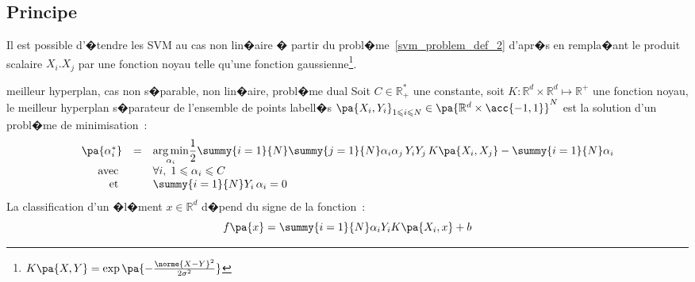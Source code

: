 \subsection{Principe}

Il est possible d'�tendre les SVM au cas non lin�aire � partir du probl�me~\ref{svm_problem_def_2} d'apr�s  en rempla�ant le produit scalaire $X_i . X_j$ par une fonction noyau telle qu'une fonction gaussienne\footnote{$K\pa{X,Y} = \exp\pa{ - \frac{ \norme{ X - Y }^2 }{2 \sigma^2}}$}.


            \begin{xproblem}{meilleur hyperplan, cas non s�parable, non lin�aire, probl�me dual}\label{svm_problem_def_3}
            Soit $C \in \mathbb{R}^*_+$ une constante, soit $K : \mathbb{R}^d \times \mathbb{R}^d \longmapsto \mathbb{R}^+$ une fonction noyau,
            le meilleur hyperplan s�parateur de l'ensemble de points labell�s
            $\pa{X_i,Y_i}_{1 \leqslant i \leqslant N} \in \pa{ \mathbb{R}^d \times \acc{-1,1} }^N$ est la solution
            d'un probl�me de minimisation~: 
                    $$
                    \begin{array}{rcl}    \pa{\alpha_i^*} &=& \underset{\alpha_i}{\arg \min} \dfrac{1}{2}  
                                                                                    \summy{i=1}{N}\summy{j=1}{N}
                                                                                            \alpha_i \alpha_j \,
                                                                                            Y_i Y_j \,
                                                                                            K\pa{X_i,X_j}
                                                                                    - \summy{i=1}{N} \alpha_i \\
                                         \text{avec }      && \forall i, \; 1 \leqslant \alpha_i \leqslant C \\
                                         \text{et }          && \summy{i=1}{N} Y_i \, \alpha_i = 0
                    \end{array}                                        
                    $$
            La classification d'un �l�ment $x \in \mathbb{R}^d$ d�pend du signe de la fonction~:
                    $$
                    f\pa{x} = \summy{i=1}{N} \alpha_i Y_i K\pa{X_i,x} + b
                    $$
            \end{xproblem}


